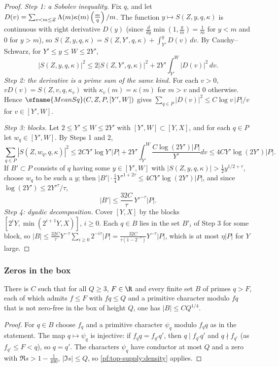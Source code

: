 \begin{proof}
\emph{Step 1: a Sobolev inequality.} Fix $q$, and let $D(v)=\sum_{v<m\le Z}\Lambda(m)\kappa(m)\left(\frac{m}{q}\right)/m$. The
function $y\mapsto S(Z,y,q,\kappa)$ is continuous with right derivative $D(y)$ (since $\frac d{dy}\min(1,\frac ym)=\frac1m$
for $y<m$ and $0$ for $y>m$), so $S(Z,y,q,\kappa)=S(Z,Y',q,\kappa)+\int_{Y'}^yD(v)\,dv$. By Cauchy--Schwarz, for
$Y'\le y\le W\le2Y'$,
\[
|S(Z,y,q,\kappa)|^2\le2|S(Z,Y',q,\kappa)|^2+2Y'\int_{Y'}^W|D(v)|^2\,dv.
\]
\emph{Step 2: the derivative is a prime sum of the same kind.} For each $v>0$, $vD(v)=S(Z,v,q,\kappa_v)$ with
$\kappa_v(m)=\kappa(m)$ for $m>v$ and $0$ otherwise. Hence $\sfname{MeanSq}(C,Z,P,[Y',W])$ gives
$\sum_{q\in P}|D(v)|^2\le C\log v\,|P|/v$ for $v\in[Y',W]$.

\emph{Step 3: blocks.} Let $2\le Y'\le W\le2Y'$ with $[Y',W]\subset[Y,X]$, and for each $q\in P$ let $w_q\in[Y',W]$.
By Steps 1 and 2,
\[
\sum_{q\in P}|S(Z,w_q,q,\kappa)|^2\le2CY'\log Y'|P|+2Y'\int_{Y'}^W\frac{C\log(2Y')|P|}{Y'}dv\le4CY'\log(2Y')|P|.
\]
If $B'\subset P$ consists of $q$ having some $y\in[Y',W]$ with $|S(Z,y,q,\kappa)|>\frac12y^{1/2+\tau}$, choose $w_q$ to be
such a $y$; then $|B'|\cdot\frac14Y'^{1+2\tau}\le4CY'\log(2Y')|P|$, and since $\log(2Y')\le2Y'^\tau/\tau$,
\[
|B'|\le\frac{32C}\tau\,Y'^{-\tau}|P|.
\]
\emph{Step 4: dyadic decomposition.} Cover $[Y,X]$ by the blocks $[2^iY,\min(2^{i+1}Y,X)]$, $i\ge0$. Each $q\in B$ lies
in the set $B'_i$ of Step 3 for some block, so
$|B|\le\frac{32C}\tau Y^{-\tau}\sum_{i\ge0}2^{-i\tau}|P|=\frac{32C}{\tau(1-2^{-\tau})}Y^{-\tau}|P|$, which is at most
$\eta|P|$ for $Y$ large.
\end{proof}

\subsubsection{Zeros in the box}

\begin{lemma}\label{pf:top-supply:countbad}
There is $C$ such that for all $Q\ge3$, $F\in\R$ and every finite set $B$ of primes $q>F$, each of which admits
$f\le F$ with $fq\le Q$ and a primitive character modulo $fq$ that is not zero-free in the box of height $Q$, one has
$|B|\le CQ^{1/4}$.  
\end{lemma}

\begin{proof}
For $q\in B$ choose $f_q$ and a primitive character $\psi_q$ modulo $f_qq$ as in the statement. The map
$q\mapsto\psi_q$ is injective: if $f_qq=f_{q'}q'$, then $q\mid f_{q'}q'$ and $q\nmid f_{q'}$ (as $f_{q'}\le F<q$), so
$q=q'$. The characters $\psi_q$ have conductor at most $Q$ and a zero with $\Re s>1-\frac1{400}$, $|\Im s|\le Q$, so
\cref{pf:top-supply:density} applies.
\end{proof}

